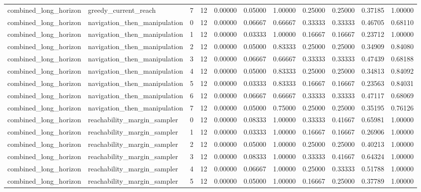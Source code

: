 \documentclass{article}
\begin{document}
\begin{table}[tbp]
{\begin{tabular}{lllllllllll}
combined\_long\_horizon & greedy\_current\_reach & 7 & 12 & 0.00000 & 0.05000 & 1.00000 & 0.25000 & 0.25000 & 0.37185 & 1.00000 \\
combined\_long\_horizon & navigation\_then\_manipulation & 0 & 12 & 0.00000 & 0.06667 & 0.66667 & 0.33333 & 0.33333 & 0.46705 & 0.68110 \\
combined\_long\_horizon & navigation\_then\_manipulation & 1 & 12 & 0.00000 & 0.03333 & 1.00000 & 0.16667 & 0.16667 & 0.23712 & 1.00000 \\
combined\_long\_horizon & navigation\_then\_manipulation & 2 & 12 & 0.00000 & 0.05000 & 0.83333 & 0.25000 & 0.25000 & 0.34909 & 0.84080 \\
combined\_long\_horizon & navigation\_then\_manipulation & 3 & 12 & 0.00000 & 0.06667 & 0.66667 & 0.33333 & 0.33333 & 0.47439 & 0.68188 \\
combined\_long\_horizon & navigation\_then\_manipulation & 4 & 12 & 0.00000 & 0.05000 & 0.83333 & 0.25000 & 0.25000 & 0.34813 & 0.84092 \\
combined\_long\_horizon & navigation\_then\_manipulation & 5 & 12 & 0.00000 & 0.03333 & 0.83333 & 0.16667 & 0.16667 & 0.23563 & 0.84031 \\
combined\_long\_horizon & navigation\_then\_manipulation & 6 & 12 & 0.00000 & 0.06667 & 0.66667 & 0.33333 & 0.33333 & 0.47117 & 0.68069 \\
combined\_long\_horizon & navigation\_then\_manipulation & 7 & 12 & 0.00000 & 0.05000 & 0.75000 & 0.25000 & 0.25000 & 0.35195 & 0.76126 \\
combined\_long\_horizon & reachability\_margin\_sampler & 0 & 12 & 0.00000 & 0.08333 & 1.00000 & 0.33333 & 0.41667 & 0.65981 & 1.00000 \\
combined\_long\_horizon & reachability\_margin\_sampler & 1 & 12 & 0.00000 & 0.03333 & 1.00000 & 0.16667 & 0.16667 & 0.26906 & 1.00000 \\
combined\_long\_horizon & reachability\_margin\_sampler & 2 & 12 & 0.00000 & 0.05000 & 1.00000 & 0.25000 & 0.25000 & 0.40213 & 1.00000 \\
combined\_long\_horizon & reachability\_margin\_sampler & 3 & 12 & 0.00000 & 0.08333 & 1.00000 & 0.33333 & 0.41667 & 0.64324 & 1.00000 \\
combined\_long\_horizon & reachability\_margin\_sampler & 4 & 12 & 0.00000 & 0.06667 & 1.00000 & 0.25000 & 0.33333 & 0.51788 & 1.00000 \\
combined\_long\_horizon & reachability\_margin\_sampler & 5 & 12 & 0.00000 & 0.05000 & 1.00000 & 0.16667 & 0.25000 & 0.37789 & 1.00000 \\

\end{tabular}}
\end{table}
\end{document}
